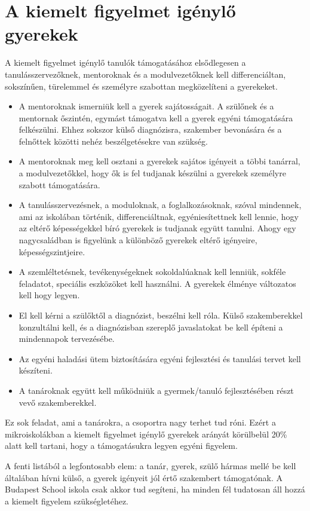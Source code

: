 \section{A kiemelt figyelmet igénylő gyerekek}
\label{sec:kiemelt_figyelem}

A kiemelt figyelmet igénylő tanulók támogatásához  elsődlegesen a tanulásszervezőknek, mentoroknak és a modulvezetőknek kell differenciáltan, sokszínűen, türelemmel és személyre szabottan megközelíteni a gyerekeket.

\begin{itemize}
      \item A mentoroknak ismerniük kell a gyerek sajátosságait. A szülőnek és a mentornak őszintén, egymást támogatva kell a gyerek egyéni támogatására felkészülni. Ehhez sokszor külső diagnózisra, szakember bevonására és a felnőttek közötti nehéz beszélgetésekre van szükség.
      \item A mentoroknak meg kell osztani a gyerekek sajátos igényeit a többi tanárral, a modulvezetőkkel, hogy ők is fel tudjanak készülni a gyerekek személyre szabott támogatására.
      \item A tanulásszervezésnek, a moduloknak, a foglalkozásoknak, szóval min\-dennek, ami az iskolában történik,  differenciáltnak, egyéniesítettnek kell lennie, hogy az eltérő képességekkel bíró gyerekek is tudjanak együtt tanulni. Ahogy egy nagycsaládban  is figyelünk a különböző gyerekek eltérő igényeire, képességszintjeire.
      \item A szemléltetésnek, tevékenységeknek sokoldalúaknak kell lenniük, sokféle feladatot, speciális eszközöket kell használni. A gyerekek élménye változatos kell hogy legyen.
      \item El kell kérni a szülőktől a diagnózist, beszélni kell róla. Külső szakemberekkel konzultálni kell, és a diagnózisban szereplő javaslatokat be kell építeni a mindennapok tervezésébe.
      \item Az egyéni haladási ütem biztosítására egyéni fejlesztési és tanulási tervet kell készíteni.
      \item A tanároknak együtt kell működniük a gyermek/tanuló fejlesztésében részt vevő szakemberekkel.
\end{itemize}

Ez sok feladat, ami a tanárokra, a csoportra nagy terhet tud róni. Ezért a mikroiskolákban a kiemelt figyelmet igénylő gyerekek arányát körülbelül 20\% alatt kell tartani, hogy a támogatásukra legyen egyéni figyelem.

A fenti listából a legfontosabb elem: a tanár, gyerek, szülő hármas mellé be kell általában hívni külső, a gyerek igényeit jól értő szakembert támogatónak. A Budapest School iskola csak akkor tud segíteni, ha minden fél tudatosan áll hozzá a kiemelt figyelem szükségletéhez.